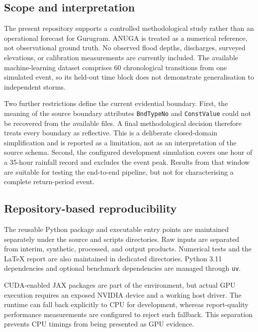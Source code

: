 \subsection{Scope and interpretation}

The present repository supports a controlled methodological study rather than
an operational forecast for Gurugram.  ANUGA is treated as a numerical
reference, not observational ground truth.  No observed flood depths,
discharges, surveyed elevations, or calibration measurements are currently
included.  The available machine-learning dataset comprises 60 chronological
transitions from one simulated event, so its held-out time block does not
demonstrate generalisation to independent storms.

Two further restrictions define the current evidential boundary.  First, the
meaning of the source boundary attributes \texttt{BndTypeNo} and
\texttt{ConstValue} could not be recovered from the available files.  A final
methodological decision therefore treats every boundary as reflective.  This
is a deliberate closed-domain simplification and is reported as a limitation,
not as an interpretation of the source schema.  Second, the configured
development simulation covers one hour of a 35-hour rainfall record and
excludes the event peak.  Results from that window are suitable for testing
the end-to-end pipeline, but not for characterising a complete return-period
event.

\subsection{Repository-based reproducibility}

The reusable Python package and executable entry points are maintained
separately under the source and scripts directories.  Raw inputs are separated
from interim, synthetic, processed, and output products.  Numerical tests and
the LaTeX report are also maintained in dedicated directories.  Python 3.11
dependencies and optional benchmark dependencies are managed through
\texttt{uv}.

CUDA-enabled JAX packages are part of the environment, but actual GPU
execution requires an exposed NVIDIA device and a working host driver.  The
runtime can fall back explicitly to CPU for development, whereas report-quality
performance measurements are configured to reject such fallback.  This
separation prevents CPU timings from being presented as GPU evidence.
